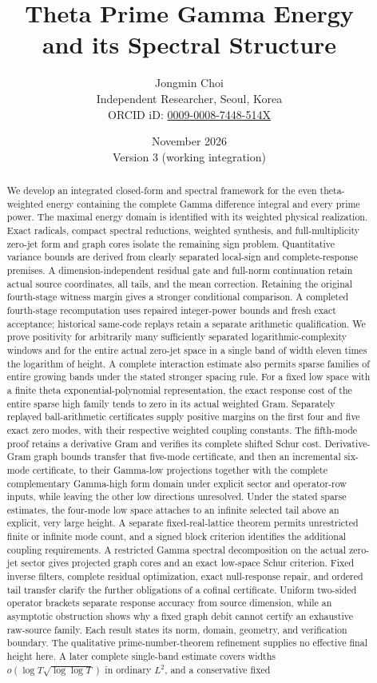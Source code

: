 \documentclass[11pt,a4paper]{article}
\title{Theta Prime Gamma Energy\\and its Spectral Structure}
\author{Jongmin Choi\\[3pt]\small Independent Researcher, Seoul, Korea\\\small ORCID iD: \href{https://orcid.org/0009-0008-7448-514X}{0009-0008-7448-514X}}
\date{November 2026\\Version 3 (working integration)}
\numberwithin{equation}{section}
\theoremstyle{definition}\newtheorem{definition}[theorem]{Definition}
\theoremstyle{remark}\newtheorem{remark}[theorem]{Remark}
\begin{document}
\maketitle
\begin{abstract}
We develop an integrated closed-form and spectral framework for the even theta-weighted energy containing the complete Gamma difference integral and every prime power. The maximal energy domain is identified with its weighted physical realization. Exact radicals, compact spectral reductions, weighted synthesis, and full-multiplicity zero-jet form and graph cores isolate the remaining sign problem. Quantitative variance bounds are derived from clearly separated local-sign and complete-response premises. A dimension-independent residual gate and full-norm continuation retain actual source coordinates, all tails, and the mean correction. Retaining the original fourth-stage witness margin gives a stronger conditional comparison. A completed fourth-stage recomputation uses repaired integer-power bounds and fresh exact acceptance; historical same-code replays retain a separate arithmetic qualification. We prove positivity for arbitrarily many sufficiently separated logarithmic-complexity windows and for the entire actual zero-jet space in a single band of width eleven times the logarithm of height. A complete interaction estimate also permits sparse families of entire growing bands under the stated stronger spacing rule. For a fixed low space with a finite theta exponential-polynomial representation, the exact response cost of the entire sparse high family tends to zero in its actual weighted Gram. Separately replayed ball-arithmetic certificates supply positive margins on the first four and five exact zero modes, with their respective weighted coupling constants. The fifth-mode proof retains a derivative Gram and verifies its complete shifted Schur cost. Derivative-Gram graph bounds transfer that five-mode certificate, and then an incremental six-mode certificate, to their Gamma-low projections together with the complete complementary Gamma-high form domain under explicit sector and operator-row inputs, while leaving the other low directions unresolved. Under the stated sparse estimates, the four-mode low space attaches to an infinite selected tail above an explicit, very large height. A separate fixed-real-lattice theorem permits unrestricted finite or infinite mode count, and a signed block criterion identifies the additional coupling requirements. A restricted Gamma spectral decomposition on the actual zero-jet sector gives projected graph cores and an exact low-space Schur criterion. Fixed inverse filters, complete residual optimization, exact null-response repair, and ordered tail transfer clarify the further obligations of a cofinal certificate. Uniform two-sided operator brackets separate response accuracy from source dimension, while an asymptotic obstruction shows why a fixed graph debit cannot certify an exhaustive raw-source family. Each result states its norm, domain, geometry, and verification boundary. The qualitative prime-number-theorem refinement supplies no effective final height here. A later complete single-band estimate covers widths $o(\log T\sqrt{\log\log T})$ in ordinary $L^2$, and a conservative fixed 
\end{abstract}
\end{document}
